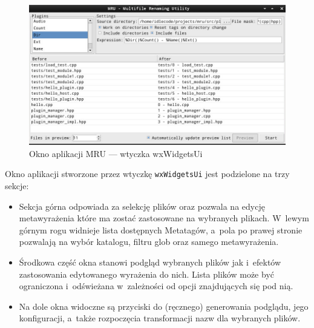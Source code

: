 \begin{figure}
\begin{center}
\includegraphics[scale=0.50]{img/wxwidgetsui.png}
\end{center}
\caption{Okno aplikacji MRU --- wtyczka wxWidgetsUi}
\end{figure}

Okno aplikacji stworzone przez wtyczkę \texttt{wxWidgetsUi} jest podzielone na trzy sekcje:
\begin{itemize}
\item Sekcja górna odpowiada za selekcję plików oraz pozwala na edycję metawyrażenia które ma zostać zastosowane na wybranych plikach.
W~lewym górnym rogu widnieje lista dostępnych Metatagów, a~pola po prawej stronie pozwalają na wybór katalogu, filtru glob oraz samego metawyrażenia.

\item Środkowa część okna stanowi podgląd wybranych plików jak i~efektów zastosowania edytowanego wyrażenia do nich. Lista plików może być ograniczona i~odświeżana w~zależności od opcji znajdujących się pod nią.

\item Na dole okna widoczne są przyciski do (ręcznego) generowania podglądu, jego konfiguracji, a~także rozpoczęcia transformacji nazw dla wybranych plików.
\end{itemize}


